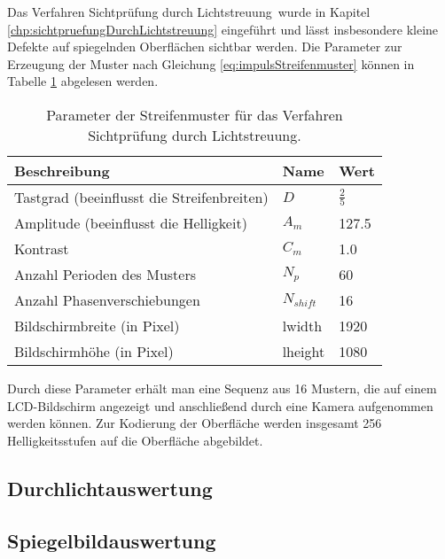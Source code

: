 Das Verfahren \glqq Sichtprüfung durch Lichtstreuung\grqq ~wurde in Kapitel \ref{chp:sichtpruefungDurchLichtstreuung} eingeführt und lässt insbesondere kleine Defekte auf spiegelnden Oberflächen sichtbar werden.
Die Parameter zur Erzeugung der Muster nach Gleichung \ref{eq:impulsStreifenmuster} können in Tabelle \ref{tab:paramSichtpruefung} abgelesen werden.

\begin{table}[H]
	\centering
	\begin{tabular}{lll}
		\hline 
		\textbf{Beschreibung} & \textbf{Name} & \textbf{Wert} \\ 
		\hline 
		Tastgrad (beeinflusst die Streifenbreiten) & $D$ & $\tfrac{2}{5}$ \\ 
		Amplitude (beeinflusst die Helligkeit) & $A_m$ & 127.5 \\ 
		Kontrast & $C_m$ & 1.0 \\ 
		Anzahl Perioden des Musters & $N_p$ & 60 \\
		Anzahl Phasenverschiebungen & $N_{shift}$ & 16 \\ 
		Bildschirmbreite (in Pixel) & \acrshort{lwidth} & 1920 \\
		Bildschirmhöhe (in Pixel) & \acrshort{lheight} & 1080 \\ 
		\hline 
	\end{tabular}
	\caption{Parameter der Streifenmuster für das Verfahren \glqq Sichtprüfung durch Lichtstreuung\grqq.}
	\label{tab:paramSichtpruefung}
\end{table}

\noindent
Durch diese Parameter erhält man eine Sequenz aus 16 Mustern, die auf einem LCD-Bildschirm angezeigt und anschließend durch eine Kamera aufgenommen werden können.
Zur Kodierung der Oberfläche werden insgesamt 256 Helligkeitsstufen auf die Oberfläche abgebildet.

{
	\FloatBarrier
    \subsection{Durchlichtauswertung}
    \label{sub:durchlichtAuswertungLichtstreuung}
    
}

{
	\FloatBarrier
    \subsection{Spiegelbildauswertung}
    \label{sub:spiegelbildAuswertungLichtstreuung}
    
}